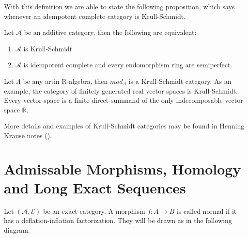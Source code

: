     With this definition we are able to state the following proposition, which says whenever an idempotent complete category is Krull-Schmidt.

    \begin{prop}
        Let $\mathcal{A}$ be an additive category, then the following are equivalent:
        \begin{enumerate}
            \item $\mathcal{A}$ is Krull-Schmidt
            \item $\mathcal{A}$ is idempotent complete and every endomorphism ring are semiperfect.
        \end{enumerate}
    \end{prop}




    \begin{example}
        Let $\Lambda$ be any artin R-algebra, then $mod_{\Lambda}$ is a Krull-Schmidt category. As an example, the category of finitely generated real vector spaces is Krull-Schmidt. Every vector space is a finite direct summand of the only indecomposable vector space $\mathbb{R}$.
    \end{example}

    More details and examples of Krull-Schmidt categories may be found in Henning Krause notes (\cite{Kra12}).

\section{Admissable Morphisms, Homology and Long Exact Sequences}
    
    \begin{definition}
        Let $(\mathcal{A},\mathcal{E})$ be an exact category. A morphism $f:A\rightarrow B$ is called normal if it has a deflation-inflation factorization. They will be drawn as in the following diagram.
        \begin{center}
        \end{center}
    \end{definition}

